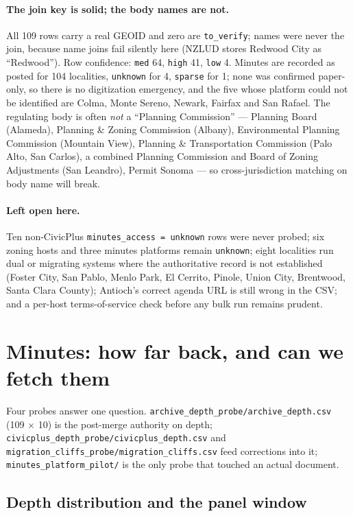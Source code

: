 \documentclass[11pt]{article}
\begin{document}
\paragraph{The join key is solid; the body names are not.} All 109 rows carry a real GEOID and
zero are \texttt{to\_verify}; names were never the join, because name joins fail silently here
(NZLUD stores Redwood City as ``Redwood''). Row confidence: \texttt{med} 64, \texttt{high} 41,
\texttt{low} 4. Minutes are recorded as posted for 104 localities, \texttt{unknown} for 4,
\texttt{sparse} for 1; none was confirmed paper-only, so there is no digitization emergency, and
the five whose platform could not be identified are Colma, Monte Sereno, Newark, Fairfax and San
Rafael. The regulating body is often \emph{not} a ``Planning Commission'' --- Planning Board
(Alameda), Planning \& Zoning Commission (Albany), Environmental Planning Commission (Mountain
View), Planning \& Transportation Commission (Palo Alto, San Carlos), a combined Planning
Commission and Board of Zoning Adjustments (San Leandro), Permit Sonoma --- so cross-jurisdiction
matching on body name will break.

\paragraph{Left open here.} Ten non-CivicPlus \texttt{minutes\_access = unknown} rows were never
probed; six zoning hosts and three minutes platforms remain \texttt{unknown}; eight localities
run dual or migrating systems where the authoritative record is not established (Foster City, San
Pablo, Menlo Park, El Cerrito, Pinole, Union City, Brentwood, Santa Clara County); Antioch's
correct agenda URL is still wrong in the CSV; and a per-host terms-of-service check before any
bulk run remains prudent.

\section{Minutes: how far back, and can we fetch them}

Four probes answer one question. \texttt{archive\_depth\_probe/archive\_depth.csv} (109 $\times$
10) is the post-merge authority on depth; \texttt{civicplus\_depth\_probe/civicplus\_depth.csv}
and \texttt{migration\_cliffs\_probe/migration\_cliffs.csv} feed corrections into it;
\texttt{minutes\_platform\_pilot/} is the only probe that touched an actual document.

\subsection{Depth distribution and the panel window}
\end{document}
